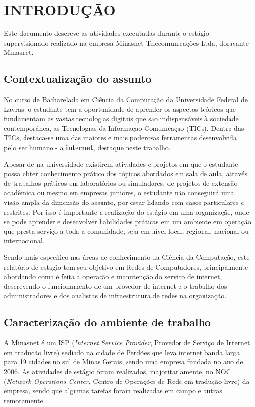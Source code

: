 \chapter{INTRODUÇÃO}

    Este documento descreve as atividades executadas durante o estágio supervisionado realizado na empresa Minasnet Telecomunicações Ltda, doravante Minasnet.

\section{Contextualização do assunto}

    No curso de Bacharelado em Ciência da Computação da Universidade Federal de Lavras, o estudante tem a oportunidade de aprender os aspectos teóricos que fundamentam as vastas tecnologias digitais que são indispensáveis à sociedade contemporânea, as Tecnologias da Informação Comunicação (TICs). Dentro das TICs, destaca-se uma das maiores e mais poderosas ferramentas desenvolvida pelo ser humano - a \textbf{internet}, destaque neste trabalho.

    Apesar de na universidade existirem atividades e projetos em que o estudante possa obter conhecimento prático dos tópicos abordados em sala de aula, através de trabalhos práticos em laboratórios ou simuladores, de projetos de extensão acadêmica ou mesmo em empresas juniores, o estudante não conseguirá uma visão ampla da dimensão do assunto, por estar lidando com casos particulares e restritos. Por isso é importante a realização do estágio em uma organização, onde se pode aprender e desenvolver habilidades práticas em um ambiente em operação que presta serviço a toda a comunidade, seja em nível local, regional, nacional ou internacional.
    
    Sendo mais específico nas áreas de conhecimento da Ciência da Computação, este relatório de estágio tem seu objetivo em Redes de Computadores, principalmente abordando como é feita a operação e manutenção do serviço de internet, descrevendo o funcionamento de um provedor de internet e o trabalho dos administradores e dos analistas de infraestrutura de redes na organização.

\section{Caracterização do ambiente de trabalho}

    A Minasnet é um ISP (\textit{Internet Service Provider}, Provedor de Serviço de Internet em tradução livre) sediado na cidade de Perdões que leva internet banda larga para 19 cidades no sul de Minas Gerais, sendo uma empresa fundada no ano de 2006. As atividades de estágio foram realizados, majoritariamente, no NOC (\textit{Network Operations Center}, Centro de Operações de Rede em tradução livre) da empresa, sendo que algumas tarefas foram realizadas em campo e outras remotamente.

